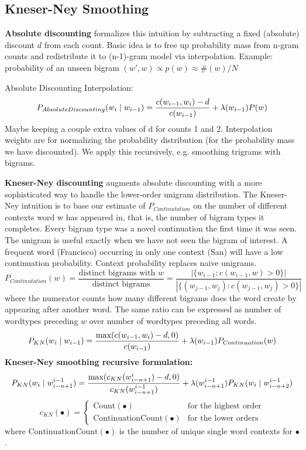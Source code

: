 \documentclass[12pt]{article}
\begin{document}
\subsection{Kneser-Ney Smoothing}
\par \textbf{Absolute discounting} formalizes this intuition by subtracting a fixed (absolute) discount $d$ from each count. Basic idea is to free up probability mass from n-gram counts and redistribute it to (n-1)-gram model via interpolation. Example: probability of an unseen bigram $(w',w) \propto p(w) \approx \#(w) / N$
\par Absolute Discounting Interpolation:
\[ P_{AbsoluteDiscounting} (w_i \mid w_{i-1}) = \frac{c(w_{i-1},w_i) - d}{c(w_{i-1})} + \lambda(w_{i-1})P(w) \]
Maybe keeping a couple extra values of d for counts 1 and 2. Interpolation weights are for normalizing the probability distribution (for the probability mass we have discounted). We apply this recursively, e.g. smoothing trigrams with bigrams.
\par \textbf{Kneser-Ney discounting} augments absolute discounting with a more sophisticated way to handle the lower-order unigram distribution. The Kneser-Ney intuition is to base our estimate of $P_{Continutation}$ on the number of different contexts word w has appeared in, that is, the number of bigram types it completes. Every bigram type was a novel continuation the first time it was seen. The unigram is useful exactly when we have not seen the bigram of interest. A frequent word (Francisco) occurring in only one context (San) will have a low continuation probability. Context probability replaces naive unigrams.
\[ P_{Continutation}(w) = \frac{\text{distinct bigrams with $w$}}{\text{distinct bigrams}} = \frac{|\{ w_{i-1}: c(w_{i-1},w) > 0 \}|}{|\{ (w_{j-1},w_j): c(w_{j-1},w_j) > 0 \}|} \]
where the numerator counts how many different bigrams does the word create by appearing after another word. The same ratio can be expressed as number of wordtypes preceding $w$ over number of wordtypes preceding all words.
\[ P_{KN}(w_i \mid w_{i-1}) = \frac{\max(c(w_{i-1},w_i) - d, 0)}{c(w_{i-1})} + \lambda(w_{i-1})P_{Continuation}(w) \]
\textbf{Kneser-Ney smoothing recursive formulation:}
\[ P_{KN}(w_i \mid w^{i-1}_{i-n+1}) = 
\frac{\max(c_{KN}(w^{i}_{i-n+1}) - d, 0)}{c_{KN}(w^{i-1}_{i-n+1})} + \lambda(w^{i-1}_{i-n+1})P_{KN}(w_i \mid w_{i-n+2}^{i-1}) \]
\[ c_{KN}(\bullet) = \begin{cases} \text{Count}(\bullet) & \text{for the highest order} \\ \text{ContinuationCount}(\bullet) & \text{for the lower orders} \end{cases} \]
where $\text{ContinuationCount}(\bullet)$ is the number of unique single word contexts for $\bullet$.
\end{document}

